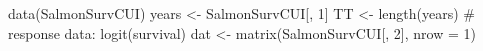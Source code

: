 \begin{Schunk}
\begin{Sinput}
 data(SalmonSurvCUI)
 years <- SalmonSurvCUI[, 1]
 TT <- length(years)
 # response data: logit(survival)
 dat <- matrix(SalmonSurvCUI[, 2], nrow = 1)
\end{Sinput}
\end{Schunk}
